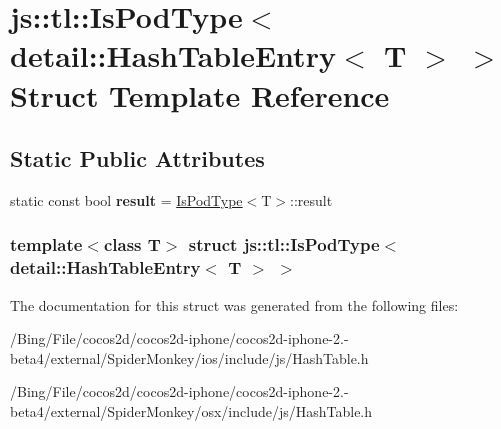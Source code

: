 \hypertarget{structjs_1_1tl_1_1_is_pod_type_3_01detail_1_1_hash_table_entry_3_01_t_01_4_01_4}{\section{js\-:\-:tl\-:\-:Is\-Pod\-Type$<$ detail\-:\-:Hash\-Table\-Entry$<$ T $>$ $>$ Struct Template Reference}
\label{structjs_1_1tl_1_1_is_pod_type_3_01detail_1_1_hash_table_entry_3_01_t_01_4_01_4}
}
\subsection*{Static Public Attributes}
\begin{DoxyCompactItemize}
\item 
\hypertarget{structjs_1_1tl_1_1_is_pod_type_3_01detail_1_1_hash_table_entry_3_01_t_01_4_01_4_a6038f973595451fa5e4c37fac060a677}{static const bool {\bfseries result} = \hyperlink{structjs_1_1tl_1_1_is_pod_type}{Is\-Pod\-Type}$<$T$>$\-::result}\label{structjs_1_1tl_1_1_is_pod_type_3_01detail_1_1_hash_table_entry_3_01_t_01_4_01_4_a6038f973595451fa5e4c37fac060a677}

\end{DoxyCompactItemize}
\subsubsection*{template$<$class T$>$ struct js\-::tl\-::\-Is\-Pod\-Type$<$ detail\-::\-Hash\-Table\-Entry$<$ T $>$ $>$}



The documentation for this struct was generated from the following files\-:\begin{DoxyCompactItemize}
\item 
/\-Bing/\-File/cocos2d/cocos2d-\/iphone/cocos2d-\/iphone-\/2.-\/beta4/external/\-Spider\-Monkey/ios/include/js/Hash\-Table.\-h\item 
/\-Bing/\-File/cocos2d/cocos2d-\/iphone/cocos2d-\/iphone-\/2.-\/beta4/external/\-Spider\-Monkey/osx/include/js/Hash\-Table.\-h\end{DoxyCompactItemize}
